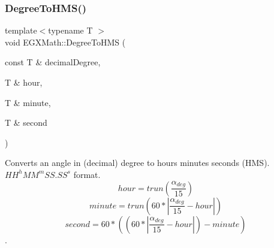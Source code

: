 \subsubsection{\texorpdfstring{Degree\+To\+H\+M\+S()}{DegreeToHMS()}}
{\footnotesize\ttfamily template$<$typename T $>$ \\
void E\+G\+X\+Math\+::\+Degree\+To\+H\+MS (\begin{DoxyParamCaption}\item[{const T \&}]{decimal\+Degree,  }\item[{T \&}]{hour,  }\item[{T \&}]{minute,  }\item[{T \&}]{second }\end{DoxyParamCaption})}



Converts an angle in (decimal) degree to hours minutes seconds (H\+MS). ${HH}^{h}{MM}^{m}{SS.SS}^{s}$ format. \[hour=trun(\frac{\alpha_{deg}}{15})\] \[minute=trun(60 * |\frac{\alpha_{deg}}{15} - hour|)\] \[second=60 * ((60 * |\frac{\alpha_{deg}}{15} - hour|)-minute)\]. 

